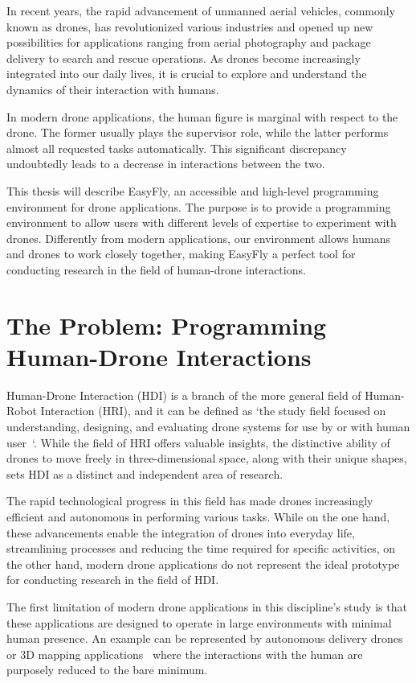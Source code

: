 In recent years, the rapid advancement of unmanned aerial vehicles, commonly known as drones,
has revolutionized various industries and opened up new possibilities for applications ranging
from aerial photography and package delivery to search and rescue operations. As drones become
increasingly integrated into our daily lives, it is crucial to explore and understand the dynamics
of their interaction with humans.

In modern drone applications, the human figure is marginal with respect to the drone.
The former usually plays the supervisor role, while the latter performs almost all requested tasks automatically.
This significant discrepancy undoubtedly leads to a decrease in interactions between the two.

This thesis will describe EasyFly, an accessible and high-level programming environment for drone applications.
The purpose is to provide a programming environment to allow users with different levels of expertise to experiment with drones. 
Differently from modern applications, our environment allows humans and drones to work closely together,
making EasyFly a perfect tool for conducting research in the field of human-drone interactions.


\section{The Problem: Programming Human-Drone Interactions}\label{sec:the_problem}
Human-Drone Interaction (HDI) is a branch of the more general field of Human-Robot Interaction (HRI), and it can be defined as 
`the study field focused on understanding, designing, and evaluating drone systems for use by or with human user~\cite{tezza2019hdi}`.
While the field of HRI offers valuable insights, the distinctive ability of drones to move freely in three-dimensional
space, along with their unique shapes, sets HDI as a distinct and independent area of research.

The rapid technological progress in this field has made drones increasingly efficient and autonomous in performing various
tasks. While on the one hand, these advancements enable the integration of drones into everyday life, streamlining processes
and reducing the time required for specific activities, on the other hand, modern drone applications do not represent the
ideal prototype for conducting research in the field of HDI.

The first limitation of modern drone applications in this discipline's study is that these applications are designed
to operate in large environments with minimal human presence. An example can be represented by autonomous delivery
drones~\cite{singireddy2018primeAir} or 3D mapping applications~\cite{nex3Dmapping} where the interactions with the human are purposely
reduced to the bare minimum.

